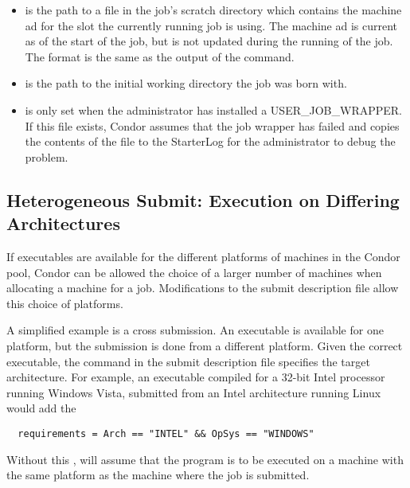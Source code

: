 \begin{itemize}
\item {}
is the path to a file in the job's scratch directory which contains
the machine ad for the slot the currently running job is using.  
The machine ad is current as of the start of the job, but is not updated during the running
of the job.  The format is the same as the output of the
   command.

\item {}
is the path to the initial working directory the job was born with.

\item {}
is only set when the administrator has installed a USER\_JOB\_WRAPPER.
If this file exists, Condor assumes that the job wrapper has failed
and copies the contents of the file to the StarterLog for the administrator
to debug the problem.

\end{itemize}



\subsection{Heterogeneous Submit: Execution on Differing Architectures} 

If executables are available for the different platforms of machines
in the Condor pool,
Condor can be allowed the choice of a larger number of machines
when allocating a machine for a job.
Modifications to the submit description file allow this choice
of platforms.

A simplified example is a cross submission.
An executable is available for one platform, but
the submission is done from a different platform.
Given the correct executable, the  command in
the submit description file specifies the target architecture.
For example, an executable compiled for a 32-bit Intel processor
running  Windows Vista, submitted
from an Intel architecture running Linux would add the 
\begin{verbatim}
  requirements = Arch == "INTEL" && OpSys == "WINDOWS"
\end{verbatim}
Without this , 
will assume that the program is to be executed on
a machine with the same platform as the machine where the job
is submitted.

